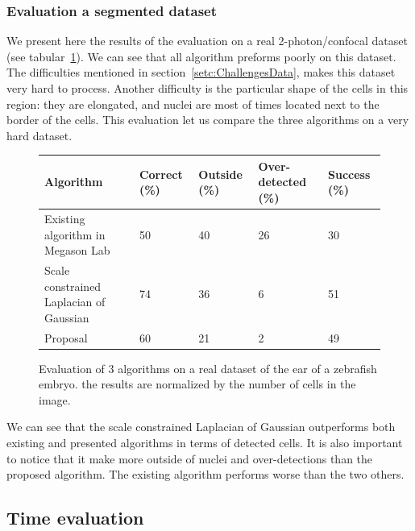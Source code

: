 \subsubsection{Evaluation a segmented dataset}

We present here the results of the evaluation on a real 2-photon/confocal dataset (see tabular~\ref{tab:realEval}). We can see that all algorithm preforms poorly on this dataset.
The difficulties mentioned in section~\ref{setc:ChallengesData}, makes this dataset very hard to process. Another difficulty is the particular shape of the cells in this region: they are elongated, and nuclei are most of times located next to the border of the cells.
This evaluation let us compare the three algorithms on a very hard dataset.
\begin{figure}[htb]
\begin{center}
\begin{tabular}{|p{2.5cm}|l|l|p{1.3cm}|l|}
\hline Algorithm & Correct (\%) & Outside (\%) & Over-detected (\%) & Success (\%) \\ 
\hline Existing algorithm in Megason Lab & 50 & 40 & 26 & 30 \\ 
\hline Scale constrained Laplacian of Gaussian &  74 & 36 & 6 & 51 \\ 
\hline Proposal & 60 & 21 & 2 & 49 \\
\hline
\end{tabular}
\end{center}
\caption{Evaluation of 3 algorithms on a real dataset of the ear of a zebrafish embryo. the results are normalized by the number of cells in the image.}
\label{tab:realEval}
\end{figure}

We can see that the scale constrained Laplacian of Gaussian outperforms both existing and presented algorithms in terms of detected cells.
It is also important to notice that it make more outside of nuclei and over-detections than the proposed algorithm.
The existing algorithm performs worse than the two others.


\subsection{Time evaluation}

